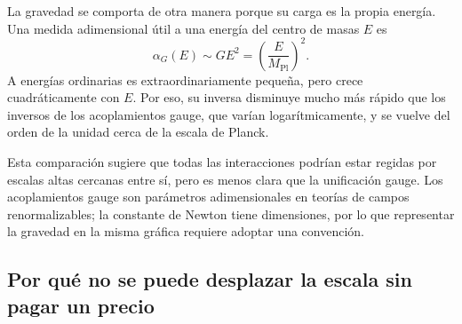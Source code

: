 La gravedad se comporta de otra manera porque su carga es la propia energía. Una medida adimensional útil a una energía del centro de masas \(E\) es
\begin{equation}
\alpha_G(E)\sim GE^2
=\left(\frac{E}{M_{\mathrm{Pl}}}\right)^2.
\end{equation}
A energías ordinarias es extraordinariamente pequeña, pero crece cuadráticamente con \(E\). Por eso, su inversa disminuye mucho más rápido que los inversos de los acoplamientos gauge, que varían logarítmicamente, y se vuelve del orden de la unidad cerca de la escala de Planck.

Esta comparación sugiere que todas las interacciones podrían estar regidas por escalas altas cercanas entre sí, pero es menos clara que la unificación gauge. Los acoplamientos gauge son parámetros adimensionales en teorías de campos renormalizables; la constante de Newton tiene dimensiones, por lo que representar la gravedad en la misma gráfica requiere adoptar una convención.

\begin{classroomqa}
\end{classroomqa}

\begin{classroomqa}
\end{classroomqa}

\subsection{Por qué no se puede desplazar la escala sin pagar un precio}

